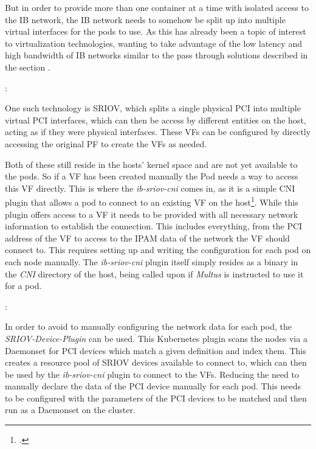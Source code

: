 But in order to provide more than one container at a time with isolated access to the \ac{IB} network,
the \ac{IB} network needs to somehow be split up into multiple virtual interfaces for the pods to use.
As this has already been a topic of interest to virtualization technologies, wanting to take
advantage of the low latency and high bandwidth of \ac{IB} networks similar to the pass through
solutions described in the section .

:

One such technology is \ac{SRIOV}, which splits a single physical \ac{PCI} into multiple virtual \ac{PCI} interfaces,
which can then be access by different entities on the host, acting as if they were physical interfaces.
These \ac{VF}s can be configured by directly accessing the original \ac{PF} to create the \ac{VF}s as needed.

Both of these still reside in the hosts' kernel space and are not yet available to the pods.
So if a \ac{VF} has been created manually the Pod needs a way to access this \ac{VF} directly.
This is where the \textit{ib-sriov-cni} comes in, as it is a simple \ac{CNI} plugin
that allows a pod to connect to an existing \ac{VF} on the host\footcite{ib-sriov-cni-repoK8snetworkplumbingwgIbsriovcniInfiniBand}.
While this plugin offers access to a \ac{VF} it needs to be
provided with all necessary network information to establish the connection.
This includes everything, from the \ac{PCI} address of the \ac{VF} to access to the \ac{IPAM}
data of the network the \ac{VF} should connect to.
This requires setting up and writing the configuration for each pod on each node manually.
The \textit{ib-sriov-cni} plugin itself simply resides as a binary in the \textit{CNI} directory of the host,
being called upon if \textit{Multus} is instructed to use it for a pod.


:

In order to avoid to manually configuring the network data for each pod,
the \textit{SRIOV-Device-Plugin} can be used.
This Kubernetes plugin scans the nodes via a Daemonset for \ac{PCI}
devices which match a given definition and index them.
This creates a resource pool of \ac{SRIOV} devices available to connect to,
which can then be used by the \textit{ib-sriov-cni} plugin to connect to the \ac{VF}s.
Reducing the need to manually declare the data of the \ac{PCI} device manually for each pod.
This needs to be configured with the parameters of the
\ac{PCI} devices to be matched and then run as a Daemonset on the cluster.



